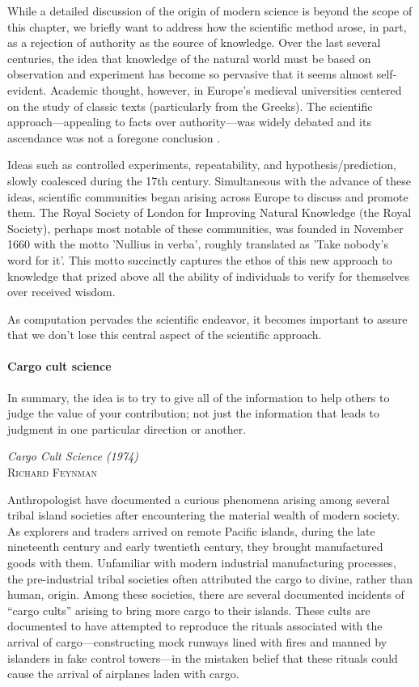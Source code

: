 \documentclass[ChapterTOCs,krantz2]{krantz} %
\begin{document}
While a detailed discussion of the origin of modern science is beyond the scope
of this chapter, we briefly want to address how the scientific method arose, in
part, as a rejection of authority as the source of knowledge. Over the last
several centuries, the idea that knowledge of the natural world must be based
on observation and experiment has become so pervasive that it seems almost
self-evident. Academic thought, however, in Europe's medieval universities
centered on the study of classic texts (particularly from the Greeks). The
scientific approach---appealing to facts over authority---was widely debated
and its ascendance was not a foregone conclusion \cite{shapin2011leviathan}.

Ideas such as controlled experiments, repeatability, and hypothesis/prediction,
slowly coalesced during the 17th century.  Simultaneous with the advance of these
ideas, scientific communities began arising across Europe to discuss and promote
them. The Royal Society of London for Improving Natural Knowledge (the Royal Society),
perhaps most notable of these communities, was founded in November 1660 with the motto
'Nullius in verba', roughly translated as 'Take nobody's word for it'. This motto
succinctly captures the ethos of this new approach to knowledge that prized above
all the ability of individuals to verify for themselves over received wisdom.

As computation pervades the scientific endeavor, it becomes important to assure
that we don't lose this central aspect of the scientific approach.

\paragraph{ {\bf Cargo cult science}}

\setlength{\epigraphrule}{0pt}
\setlength{\epigraphwidth}{.65\textwidth}
\epigraph%
{%
  In summary, the idea is to try to give all of the information to
  help others to judge the value of your contribution; not just the
  information that leads to judgment in one particular direction or
  another.
}%
{\textit{Cargo Cult Science (1974)}\\ \textsc{Richard Feynman} }


Anthropologist have documented a curious phenomena arising among several tribal
island societies after encountering the material wealth of modern society. As
explorers and traders arrived on remote Pacific islands, during the late
nineteenth century and early twentieth century, they brought manufactured goods
with them.  Unfamiliar with modern industrial manufacturing processes, the
pre-industrial tribal societies often attributed the cargo to divine, rather
than human, origin. Among these societies, there are several documented
incidents of ``cargo cults'' arising to bring more cargo to their islands.
These cults are documented to have attempted to reproduce the rituals associated
with the arrival of cargo---constructing mock runways lined with fires and manned
by islanders in fake control towers---in the mistaken
belief that these rituals could cause the arrival of airplanes laden with
cargo.
\end{document}

